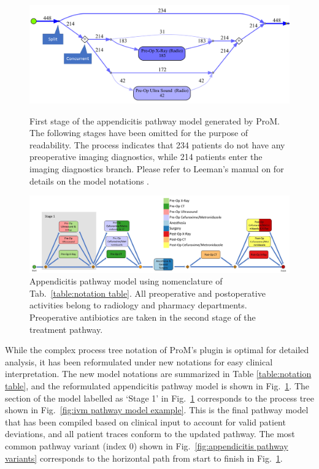 \begin{figure}[t]
\includegraphics[width=\textwidth]{images/ivm_appendicitis_first_stage_example.png}
\caption{First stage of the appendicitis pathway model generated by
  ProM. The following stages have been omitted for the purpose of
  readability.
  The process indicates that 234 patients do not have any preoperative
  imaging diagnostics, while 214 patients enter the imaging
  diagnostics branch.
  Please refer to Leeman's manual on  for details on the model notations \cite{leemansinductive}.}
\label{fig:ivm pathway model example}

\includegraphics[width=\textwidth]{images/communicative_appendicitis_process_models_anes.jpg}
\caption{Appendicitis pathway model using nomenclature of Tab.~\ref{table:notation table}. All preoperative and
  postoperative activities belong to radiology and pharmacy
  departments. Preoperative antibiotics are taken in the second stage
  of the treatment pathway.}
\label{fig:appendicitis pathway model}
\end{figure}

While the complex process tree notation of ProM's  plugin is optimal for detailed analysis, it has been
reformulated under new notations for easy clinical interpretation.
The new model notations are summarized in Table \ref{table:notation
  table}, and the reformulated appendicitis pathway model is shown in
Fig.~\ref{fig:appendicitis pathway model}. The section of the model
labelled as `Stage 1' in Fig.~\ref{fig:appendicitis pathway model}
corresponds to the process tree shown in Fig.~\ref{fig:ivm pathway
  model example}.
This is the final pathway model that has been compiled based on
clinical input to account for valid patient deviations, and all
patient traces conform to the updated pathway.
The most common pathway variant (index 0) shown in Fig.~\ref{fig:appendicitis pathway variants} corresponds to the horizontal path from start to finish in Fig.~\ref{fig:appendicitis pathway model}.


